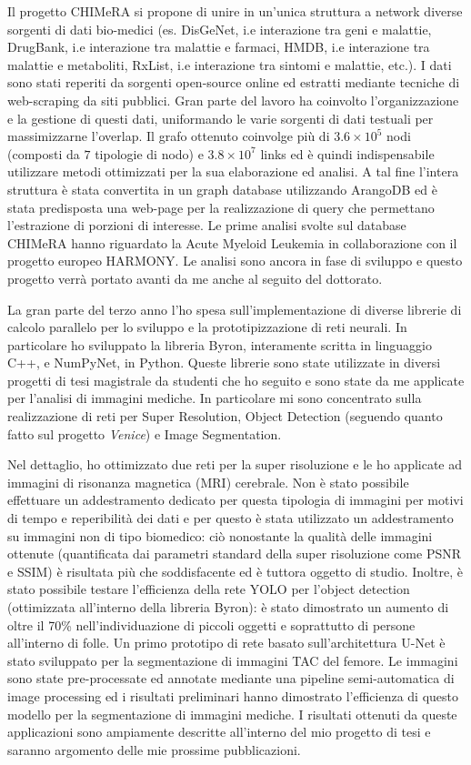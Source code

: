 \documentclass{standalone}
\begin{document}
Il progetto CHIMeRA si propone di unire in un'unica struttura a network diverse sorgenti di dati bio-medici (es. DisGeNet, i.e interazione tra geni e malattie, DrugBank, i.e interazione tra malattie e farmaci, HMDB, i.e interazione tra malattie e metaboliti, RxList, i.e interazione tra sintomi e malattie, etc.).
I dati sono stati reperiti da sorgenti open-source online ed estratti mediante tecniche di web-scraping da siti pubblici.
Gran parte del lavoro ha coinvolto l'organizzazione e la gestione di questi dati, uniformando le varie sorgenti di dati testuali per massimizzarne l'overlap.
Il grafo ottenuto coinvolge più di $3.6\times10^5$ nodi (composti da $7$ tipologie di nodo) e $3.8\times10^7$ links ed è quindi indispensabile utilizzare metodi ottimizzati per la sua elaborazione ed analisi.
A tal fine l'intera struttura è stata convertita in un graph database utilizzando ArangoDB ed è stata predisposta una web-page per la realizzazione di query che permettano l'estrazione di porzioni di interesse.
Le prime analisi svolte sul database CHIMeRA hanno riguardato la Acute Myeloid Leukemia in collaborazione con il progetto europeo HARMONY.
Le analisi sono ancora in fase di sviluppo e questo progetto verrà portato avanti da me anche al seguito del dottorato.

La gran parte del terzo anno l'ho spesa sull'implementazione di diverse librerie di calcolo parallelo per lo sviluppo e la prototipizzazione di reti neurali.
In particolare ho sviluppato la libreria Byron, interamente scritta in linguaggio C++, e NumPyNet, in Python.
Queste librerie sono state utilizzate in diversi progetti di tesi magistrale da studenti che ho seguito e sono state da me applicate per l'analisi di immagini mediche.
In particolare mi sono concentrato sulla realizzazione di reti per Super Resolution, Object Detection (seguendo quanto fatto sul progetto \emph{Venice}) e Image Segmentation.

Nel dettaglio, ho ottimizzato due reti per la super risoluzione e le ho applicate ad immagini di risonanza magnetica (MRI) cerebrale.
Non è stato possibile effettuare un addestramento dedicato per questa tipologia di immagini per motivi di tempo e reperibilità dei dati e per questo è stata utilizzato un addestramento su immagini non di tipo biomedico: ciò nonostante la qualità delle immagini ottenute (quantificata dai parametri standard della super risoluzione come PSNR e SSIM) è risultata più che soddisfacente ed è tuttora oggetto di studio.
Inoltre, è stato possibile testare l'efficienza della rete YOLO per l'object detection (ottimizzata all'interno della libreria Byron): è stato dimostrato un aumento di oltre il 70\% nell'individuazione di piccoli oggetti e soprattutto di persone all'interno di folle.
Un primo prototipo di rete basato sull'architettura U-Net è stato sviluppato per la segmentazione di immagini TAC del femore.
Le immagini sono state pre-processate ed annotate mediante una pipeline semi-automatica di image processing ed i risultati preliminari hanno dimostrato l'efficienza di questo modello per la segmentazione di immagini mediche.
I risultati ottenuti da queste applicazioni sono ampiamente descritte all'interno del mio progetto di tesi e saranno argomento delle mie prossime pubblicazioni.
\end{document}
